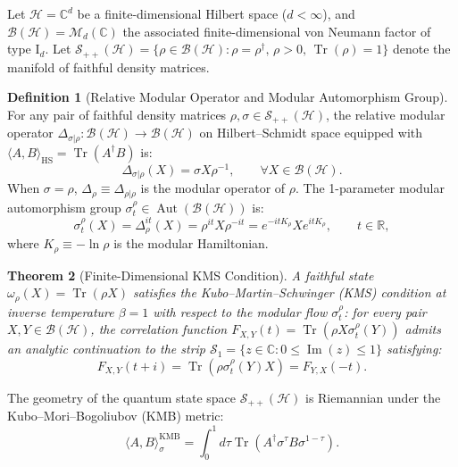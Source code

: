 \documentclass[11pt,a4paper,reqno]{article}
\newtheorem{theorem}{Theorem}[section]
\theoremstyle{definition}
\newtheorem{definition}[theorem]{Definition}
\DeclareMathOperator{\Tr}{Tr}
\numberwithin{equation}{section}
\begin{document}
Let $\mathcal{H} = \mathbb{C}^d$ be a finite-dimensional Hilbert space ($d < \infty$), and $\mathcal{B}(\mathcal{H}) = \mathcal{M}_d(\mathbb{C})$ the associated finite-dimensional von Neumann factor of type $\mathrm{I}_d$. Let $\mathcal{S}_{++}(\mathcal{H}) = \{ \rho \in \mathcal{B}(\mathcal{H}) : \rho = \rho^\dagger, \, \rho > 0, \, \Tr(\rho) = 1 \}$ denote the manifold of faithful density matrices.

\begin{definition}[Relative Modular Operator and Modular Automorphism Group]
For any pair of faithful density matrices $\rho, \sigma \in \mathcal{S}_{++}(\mathcal{H})$, the relative modular operator $\Delta_{\sigma|\rho} : \mathcal{B}(\mathcal{H}) \to \mathcal{B}(\mathcal{H})$ on Hilbert--Schmidt space equipped with $\langle A, B \rangle_{\text{HS}} = \Tr(A^\dagger B)$ is:
\begin{equation}
\Delta_{\sigma|\rho}(X) = \sigma X \rho^{-1}, \qquad \forall X \in \mathcal{B}(\mathcal{H}).
\end{equation}
When $\sigma = \rho$, $\Delta_\rho \equiv \Delta_{\rho|\rho}$ is the modular operator of $\rho$. The 1-parameter modular automorphism group $\sigma_t^\rho \in \operatorname{Aut}(\mathcal{B}(\mathcal{H}))$ is:
\begin{equation}
\sigma_t^\rho(X) = \Delta_\rho^{it}(X) = \rho^{it} X \rho^{-it} = e^{-it K_\rho} X e^{it K_\rho}, \qquad t \in \mathbb{R},
\end{equation}
where $K_\rho \equiv -\ln \rho$ is the modular Hamiltonian.
\end{definition}

\begin{theorem}[Finite-Dimensional KMS Condition]
A faithful state $\omega_\rho(X) = \Tr(\rho X)$ satisfies the Kubo--Martin--Schwinger (KMS) condition at inverse temperature $\beta = 1$ with respect to the modular flow $\sigma_t^\rho$: for every pair $X, Y \in \mathcal{B}(\mathcal{H})$, the correlation function $F_{X, Y}(t) = \Tr(\rho X \sigma_t^\rho(Y))$ admits an analytic continuation to the strip $\mathcal{S}_1 = \{ z \in \mathbb{C} : 0 \le \operatorname{Im}(z) \le 1 \}$ satisfying:
\begin{equation}
F_{X, Y}(t + i) = \Tr(\rho \sigma_t^\rho(Y) X) = F_{Y, X}(-t).
\end{equation}
\end{theorem}

The geometry of the quantum state space $\mathcal{S}_{++}(\mathcal{H})$ is Riemannian under the Kubo--Mori--Bogoliubov (KMB) metric:
\begin{equation}
\langle A, B \rangle_{\sigma}^{\text{KMB}} = \int_0^1 d\tau \Tr\left( A^\dagger \sigma^\tau B \sigma^{1-\tau} \right).
\label{eq:kmb_metric}
\end{equation}
\end{document}
